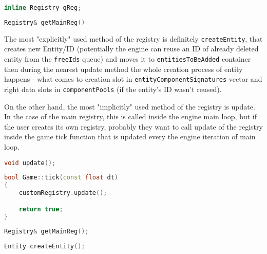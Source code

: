 \begin{lstlisting}[language=c++, caption=Private method of access to the main registry (./tsengine/engine/src/globals.hpp)]
inline Registry gReg;
\end{lstlisting}

\begin{lstlisting}[language=c++, caption=Public method of access to the main registry (./tsengine/engine/src/globals.hpp)]
Registry& getMainReg()
\end{lstlisting}

The most "explicitly" used method of the registry is definitely \texttt{createEntity}, that creates new Entity/ID (potentially the engine can reuse an ID of already deleted entity from the \texttt{freeIds} queue) and moves it to \texttt{entitiesToBeAdded} container then during the nearest update method the whole creation process of entity happens - what comes to creation slot in \texttt{entityComponentSignatures} vector and right data slots in \texttt{componentPools} (if the entity's ID wasn't reused).

On the other hand, the most "implicitly" used method of the registry is update. In the case of the main registry, this is called inside the engine main loop, but if the user creates its own registry, probably they want to call update of the registry inside the game tick function that is updated every the engine iteration of main loop.
\begin{lstlisting}[language=c++, caption=ECS Registry update method (./engine/include/tsengine/ecs/ecs.h)]
void update();
\end{lstlisting}

\begin{lstlisting}[language=c++, caption=An example of how custom registry should be updated]
bool Game::tick(const float dt)
{
    customRegistry.update();

    return true;
}
\end{lstlisting}

\begin{lstlisting}[language=c++, caption=Public method of access to the main registry (./tsengine/engine/src/globals.hpp)]
Registry& getMainReg();
\end{lstlisting}

\begin{lstlisting}[language=c++, caption=Creation of the an entity (./engine/include/tsengine/ecs/ecs.h)]
Entity createEntity();
\end{lstlisting}

